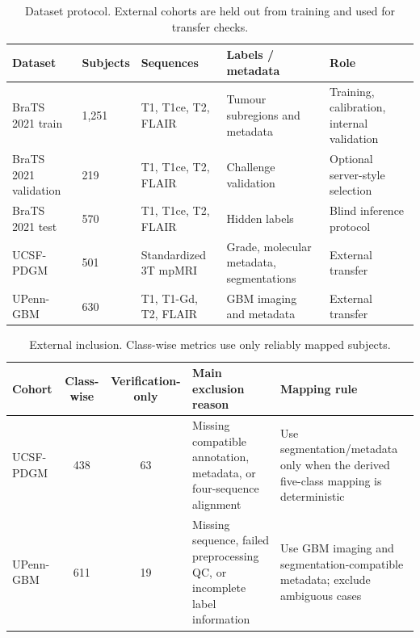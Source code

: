 \documentclass[preprint,11pt]{elsarticle}
\begin{document}
\begin{table}[H]
\centering
\caption{Dataset protocol. External cohorts are held out from training and used for transfer checks.}
\label{tab:dataset_large}
\scriptsize
\begin{tabularx}{\textwidth}{p{2.6cm}p{1.5cm}Y Y Y}
\toprule
\textbf{Dataset} & \textbf{Subjects} & \textbf{Sequences} & \textbf{Labels / metadata} & \textbf{Role} \\
\midrule
BraTS 2021 train & 1,251 & T1, T1ce, T2, FLAIR & Tumour subregions and metadata & Training, calibration, internal validation \\
BraTS 2021 validation & 219 & T1, T1ce, T2, FLAIR & Challenge validation & Optional server-style selection \\
BraTS 2021 test & 570 & T1, T1ce, T2, FLAIR & Hidden labels & Blind inference protocol \\
UCSF-PDGM & 501 & Standardized 3T mpMRI & Grade, molecular metadata, segmentations & External transfer \\
UPenn-GBM & 630 & T1, T1-Gd, T2, FLAIR & GBM imaging and metadata & External transfer \\
\bottomrule
\end{tabularx}
\end{table}

\begin{table}[H]
\centering
\caption{External inclusion. Class-wise metrics use only reliably mapped subjects.}
\label{tab:external_inclusion}
\scriptsize
\begin{adjustbox}{max width=\textwidth}
\begin{tabular}{lccp{5.3cm}p{4.2cm}}
\toprule
\textbf{Cohort} & \textbf{Class-wise} & \textbf{Verification-only} & \textbf{Main exclusion reason} & \textbf{Mapping rule} \\
\midrule
UCSF-PDGM & 438 & 63 & Missing compatible annotation, metadata, or four-sequence alignment & Use segmentation/metadata only when the derived five-class mapping is deterministic \\
UPenn-GBM & 611 & 19 & Missing sequence, failed preprocessing QC, or incomplete label information & Use GBM imaging and segmentation-compatible metadata; exclude ambiguous cases \\
\bottomrule
\end{tabular}
\end{adjustbox}
\end{table}
\end{document}
